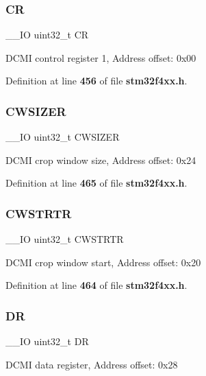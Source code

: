 \subsubsection{CR}
{\footnotesize\ttfamily \+\_\+\+\_\+\+IO uint32\+\_\+t CR}

D\+C\+MI control register 1, Address offset\+: 0x00 

Definition at line \textbf{ 456} of file \textbf{ stm32f4xx.\+h}.

\mbox{\label{structDCMI__TypeDef_aa3ccc5d081bbee3c61ae9aa5e0c83af9}} 
\subsubsection{C\+W\+S\+I\+Z\+ER}
{\footnotesize\ttfamily \+\_\+\+\_\+\+IO uint32\+\_\+t C\+W\+S\+I\+Z\+ER}

D\+C\+MI crop window size, Address offset\+: 0x24 

Definition at line \textbf{ 465} of file \textbf{ stm32f4xx.\+h}.

\mbox{\label{structDCMI__TypeDef_a919b70dd8762e44263a02dfbafc7b8ce}} 
\subsubsection{C\+W\+S\+T\+R\+TR}
{\footnotesize\ttfamily \+\_\+\+\_\+\+IO uint32\+\_\+t C\+W\+S\+T\+R\+TR}

D\+C\+MI crop window start, Address offset\+: 0x20 

Definition at line \textbf{ 464} of file \textbf{ stm32f4xx.\+h}.

\mbox{\label{structDCMI__TypeDef_a3df0d8dfcd1ec958659ffe21eb64fa94}} 
\subsubsection{DR}
{\footnotesize\ttfamily \+\_\+\+\_\+\+IO uint32\+\_\+t DR}

D\+C\+MI data register, Address offset\+: 0x28 

